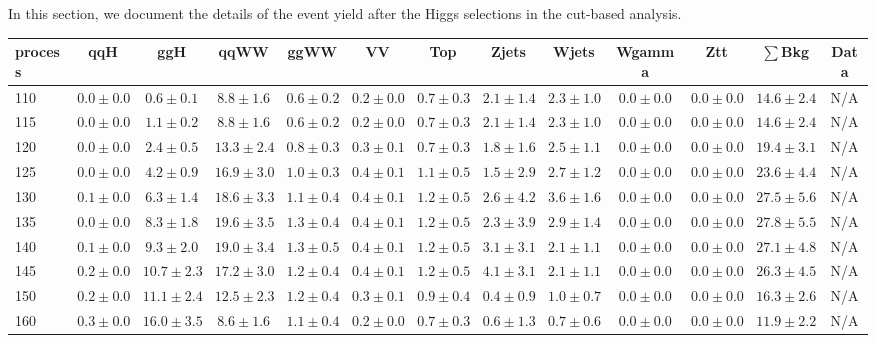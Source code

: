 In this section, we document the details of the event yield after the Higgs 
selections in the cut-based analysis. 

\begin{table}
{%
 \tiny
 \begin{center}
 \begin{tabular}{l | c c | c c c c c c c c  | c c}
 \hline
 process & qqH & ggH & qqWW & ggWW & VV & Top & Zjets & Wjets & Wgamma & Ztt & $\sum$Bkg & Data \\
 \hline
110 & $0.0\pm0.0$ & $0.6\pm0.1$ & $8.8\pm1.6$ & $0.6\pm0.2$ & $0.2\pm0.0$ & $0.7\pm0.3$ & $2.1\pm1.4$ & $2.3\pm1.0$ & $0.0\pm0.0$ & $0.0\pm0.0$ & $14.6\pm2.4$ & N/A \\ 
115 & $0.0\pm0.0$ & $1.1\pm0.2$ & $8.8\pm1.6$ & $0.6\pm0.2$ & $0.2\pm0.0$ & $0.7\pm0.3$ & $2.1\pm1.4$ & $2.3\pm1.0$ & $0.0\pm0.0$ & $0.0\pm0.0$ & $14.6\pm2.4$ & N/A \\ 
120 & $0.0\pm0.0$ & $2.4\pm0.5$ & $13.3\pm2.4$ & $0.8\pm0.3$ & $0.3\pm0.1$ & $0.7\pm0.3$ & $1.8\pm1.6$ & $2.5\pm1.1$ & $0.0\pm0.0$ & $0.0\pm0.0$ & $19.4\pm3.1$ & N/A \\
125 & $0.0\pm0.0$ & $4.2\pm0.9$ & $16.9\pm3.0$ & $1.0\pm0.3$ & $0.4\pm0.1$ & $1.1\pm0.5$ & $1.5\pm2.9$ & $2.7\pm1.2$ & $0.0\pm0.0$ & $0.0\pm0.0$ & $23.6\pm4.4$ & N/A \\
130 & $0.1\pm0.0$ & $6.3\pm1.4$ & $18.6\pm3.3$ & $1.1\pm0.4$ & $0.4\pm0.1$ & $1.2\pm0.5$ & $2.6\pm4.2$ & $3.6\pm1.6$ & $0.0\pm0.0$ & $0.0\pm0.0$ & $27.5\pm5.6$ & N/A \\
135 & $0.0\pm0.0$ & $8.3\pm1.8$ & $19.6\pm3.5$ & $1.3\pm0.4$ & $0.4\pm0.1$ & $1.2\pm0.5$ & $2.3\pm3.9$ & $2.9\pm1.4$ & $0.0\pm0.0$ & $0.0\pm0.0$ & $27.8\pm5.5$ & N/A \\
140 & $0.1\pm0.0$ & $9.3\pm2.0$ & $19.0\pm3.4$ & $1.3\pm0.5$ & $0.4\pm0.1$ & $1.2\pm0.5$ & $3.1\pm3.1$ & $2.1\pm1.1$ & $0.0\pm0.0$ & $0.0\pm0.0$ & $27.1\pm4.8$ & N/A \\
145 & $0.2\pm0.0$ & $10.7\pm2.3$ & $17.2\pm3.0$ & $1.2\pm0.4$ & $0.4\pm0.1$ & $1.2\pm0.5$ & $4.1\pm3.1$ & $2.1\pm1.1$ & $0.0\pm0.0$ & $0.0\pm0.0$ & $26.3\pm4.5$ & N/A \\
150 & $0.2\pm0.0$ & $11.1\pm2.4$ & $12.5\pm2.3$ & $1.2\pm0.4$ & $0.3\pm0.1$ & $0.9\pm0.4$ & $0.4\pm0.9$ & $1.0\pm0.7$ & $0.0\pm0.0$ & $0.0\pm0.0$ & $16.3\pm2.6$ & N/A \\
160 & $0.3\pm0.0$ & $16.0\pm3.5$ & $8.6\pm1.6$ & $1.1\pm0.4$ & $0.2\pm0.0$ & $0.7\pm0.3$ & $0.6\pm1.3$ & $0.7\pm0.6$ & $0.0\pm0.0$ & $0.0\pm0.0$ & $11.9\pm2.2$ & N/A \\ 

\end{tabular}
\end{center}}
\end{table}
